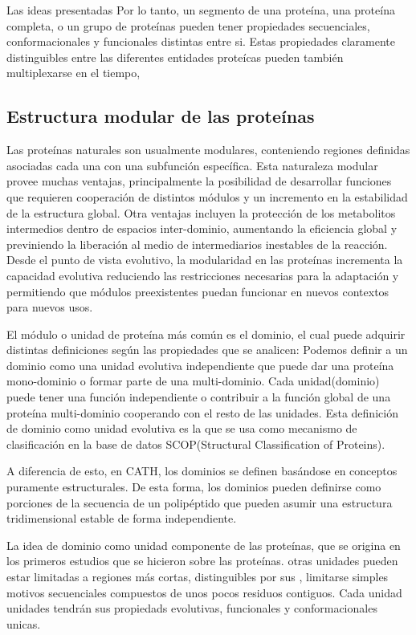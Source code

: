 Las ideas presentadas 
Por lo tanto, un segmento de una proteína, una proteína completa, o un grupo de proteínas pueden tener propiedades secuenciales, conformacionales y funcionales distintas entre si.
Estas propiedades claramente distinguibles entre las diferentes entidades proteícas pueden también multiplexarse en el tiempo, 


\subsection{Estructura modular de las proteínas}

Las proteínas naturales son usualmente modulares, conteniendo regiones definidas asociadas cada una con una subfunción específica.
Esta naturaleza modular provee muchas ventajas, principalmente la posibilidad de desarrollar funciones que requieren cooperación de distintos módulos y un incremento en la estabilidad de la estructura global.
Otra ventajas incluyen la protección de los metabolitos intermedios dentro de espacios inter-dominio, aumentando la eficiencia global y previniendo la liberación al medio de intermediarios inestables de la reacción.  
Desde el punto de vista evolutivo, la modularidad en las proteínas incrementa la capacidad evolutiva reduciendo las restricciones necesarias 
para la adaptación y permitiendo que módulos preexistentes puedan funcionar en nuevos contextos para nuevos usos.

El módulo o unidad de proteína más común es el dominio, el cual puede adquirir distintas definiciones según las propiedades que se analicen:
Podemos definir a un dominio como una unidad evolutiva independiente que puede dar una proteína mono-dominio o formar parte de una multi-dominio. 
Cada unidad(dominio) puede tener una función independiente o contribuir a la función global de una proteína multi-dominio cooperando con el resto de las unidades.
Esta definición de dominio como unidad evolutiva es la que se usa como mecanismo de clasificación en la base de datos SCOP(Structural Classification of Proteins)\cite{murzin1995scop}. 

A diferencia de esto, en CATH\cite{orengo1997cath}, los dominios se definen basándose en conceptos puramente estructurales. 
De esta forma, los dominios pueden definirse como porciones de la secuencia de un polipéptido que pueden asumir una estructura tridimensional estable de forma independiente. 

La idea de dominio como unidad componente de las proteínas, que se origina en los primeros estudios que se hicieron sobre las proteínas.
otras unidades pueden estar limitadas a regiones más cortas, distinguibles por sus , limitarse simples motivos secuenciales compuestos de unos pocos residuos contiguos.
Cada unidad unidades tendrán sus propiedads evolutivas, funcionales y conformacionales unicas.

